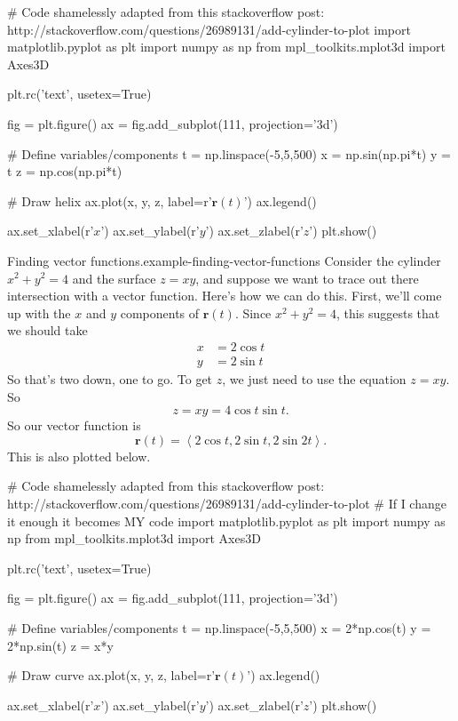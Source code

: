\documentclass[10pt,]{book}
\numberwithin{equation}{section}
\newcommand{\vv}[1]{\mathbf{#1}}
\newcommand{\dotprod}[1]{\left\langle #1 \right\rangle}
\begin{document}
\begin{sageinput}
# Code shamelessly adapted from this stackoverflow post: http://stackoverflow.com/questions/26989131/add-cylinder-to-plot
import matplotlib.pyplot as plt
import numpy as np
from mpl_toolkits.mplot3d import Axes3D

plt.rc('text', usetex=True)

fig = plt.figure()
ax = fig.add_subplot(111, projection='3d')

# Define variables/components
t = np.linspace(-5,5,500)
x = np.sin(np.pi*t)
y = t
z = np.cos(np.pi*t)

# Draw helix
ax.plot(x, y, z, label=r'$\mathbf{r}(t)$')
ax.legend()

ax.set_xlabel(r'$x$')
ax.set_ylabel(r'$y$')
ax.set_zlabel(r'$z$')
plt.show()
\end{sageinput}
\begin{example}{Finding vector functions.}{example-finding-vector-functions}%
\hypertarget{p-1258}{}%
Consider the cylinder \(x^{2}+y^{2}=4\) and the surface \(z=xy\), and suppose we want to trace out there intersection with a vector function. Here's how we can do this. First, we'll come up with the \(x\) and \(y\) components of \(\vv{r}(t)\). Since \(x^{2}+y^{2} = 4\), this suggests that we should take%
%
\begin{align*}
x & = 2\cos t \\
y & = 2\sin t 
\end{align*}
\hypertarget{p-1259}{}%
So that's two down, one to go. To get \(z\), we just need to use the equation \(z=xy\). So%
%
\begin{equation*}
z = xy = 4\cos t\sin t.
\end{equation*}
\hypertarget{p-1260}{}%
So our vector function is%
%
\begin{equation*}
\vv{r}(t) = \dotprod{2\cos t, 2\sin t, 2\sin 2t}.
\end{equation*}
\hypertarget{p-1261}{}%
This is also plotted below.%
\end{example}
\begin{sageinput}
# Code shamelessly adapted from this stackoverflow post: http://stackoverflow.com/questions/26989131/add-cylinder-to-plot
# If I change it enough it becomes MY code
import matplotlib.pyplot as plt
import numpy as np
from mpl_toolkits.mplot3d import Axes3D

plt.rc('text', usetex=True)

fig = plt.figure()
ax = fig.add_subplot(111, projection='3d')

# Define variables/components
t = np.linspace(-5,5,500)
x = 2*np.cos(t)
y = 2*np.sin(t)
z = x*y

# Draw curve
ax.plot(x, y, z, label=r'$\mathbf{r}(t)$')
ax.legend()

ax.set_xlabel(r'$x$')
ax.set_ylabel(r'$y$')
ax.set_zlabel(r'$z$')
plt.show()
\end{sageinput}
%
%
\typeout{************************************************}
\typeout{************************************************}
%
\end{document}

